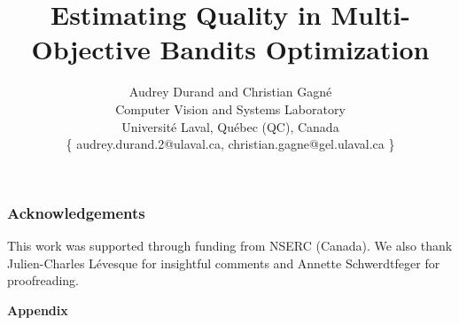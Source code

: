 \documentclass[11pt]{article}
\begin{document}
\title{Estimating Quality in Multi-Objective Bandits Optimization}

\author{Audrey Durand and Christian Gagn\'e \\
Computer Vision and Systems Laboratory \\
Universit\'e Laval, Qu\'ebec (QC), Canada\\
\{ audrey.durand.2@ulaval.ca, christian.gagne@gel.ulaval.ca \}
}

\maketitle

\begin{abstract}
    
\end{abstract}















\subsubsection*{Acknowledgements}

This work was supported through funding from NSERC (Canada). We also thank Julien-Charles L\'evesque for insightful comments and Annette Schwerdtfeger for proofreading.


%


\newpage
\appendix
{\LARGE\textbf{Appendix}}

\end{document}
